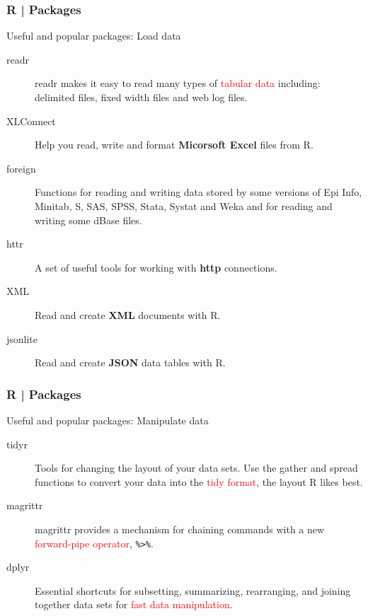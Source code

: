 \begin{frame}
  \frametitle{R | Packages}
  \begin{block}{Useful and popular packages: Load data}
    \begin{description}
      \item[\alert{readr}] readr makes it easy to read many types of \textcolor{red}{tabular data} including: delimited files, fixed width files and web log files.
      \item[XLConnect] Help you read, write and format \textbf{Micorsoft Excel} files from R.
      \item[foreign] Functions for reading and writing data stored by some versions of Epi Info, Minitab, S, SAS, SPSS, Stata, Systat and Weka and for reading and writing some dBase files.
      \item[httr] A set of useful tools for working with \textbf{http} connections.
      \item[XML] Read and create \textbf{XML} documents with R.
      \item[jsonlite] Read and create \textbf{JSON} data tables with R.
    \end{description}
  \end{block}
\end{frame}

\begin{frame}[fragile]
  \frametitle{R | Packages}
  \begin{block}{Useful and popular packages: Manipulate data}
    \begin{description}
      \item[\alert{tidyr}] Tools for changing the layout of your data sets. Use the gather and spread functions to convert your data into the \textcolor{red}{tidy format}, the layout R likes best.
      \item[\alert{magrittr}] magrittr provides a mechanism for chaining commands with a new \textcolor{red}{forward-pipe operator}, \verb|%>%|.
      \item[\alert{dplyr}] Essential shortcuts for subsetting, summarizing, rearranging, and joining together data sets for \textcolor{red}{fast data manipulation}.
    \end{description}
  \end{block}
\end{frame}

